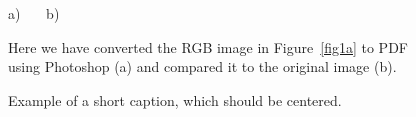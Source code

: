 \documentclass[10pt,twocolumn,letterpaper]{article}
\begin{document}
\begin{figure}[th]
\begin{center}
a)  \ \ \ 
b) %
\end{center}
\caption{
    Here we have converted the RGB image in Figure~\ref{fig1a} to
    PDF using Photoshop (a) and compared it to the original image (b).
}
\label{fig1b}
\end{figure}



\begin{figure}
\begin{center}
\fbox{ %
\rule{0pt}{0.5in} \rule{.9\linewidth}{0pt}
}
\end{center}
   \caption{Example of a short caption, which should be centered.}
\label{fig:short}
\end{figure}
\end{document}
